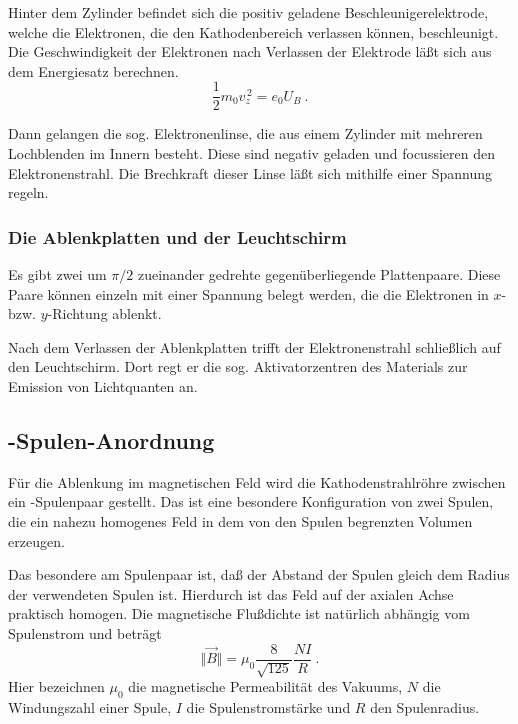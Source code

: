 Hinter dem Zylinder befindet sich die positiv geladene
Beschleunigerelektrode, welche die Elektronen, die den Kathodenbereich
verlassen können, beschleunigt. Die Geschwindigkeit der Elektronen nach
Verlassen der Elektrode läßt sich aus dem Energiesatz berechnen.
%
\begin{equation}
  \label{eq:acc-volt-vel-z}
  \frac{1}{2} m_0 v_z^{\,2} = e_0 U_B \:.
\end{equation}

Dann gelangen die sog. Elektronenlinse, die aus einem Zylinder mit
mehreren Lochblenden im Innern besteht. Diese sind negativ geladen und
focussieren den Elektronenstrahl. Die Brechkraft dieser Linse läßt sich
mithilfe einer Spannung regeln.

\subsubsection{Die Ablenkplatten und der Leuchtschirm}

Es gibt zwei um $\pi/2$ zueinander gedrehte gegenüberliegende
Plattenpaare. Diese Paare können einzeln mit einer Spannung belegt
werden, die die Elektronen in $x$- bzw. $y$-Richtung ablenkt.

Nach dem Verlassen der Ablenkplatten trifft der Elektronenstrahl
schließlich auf den Leuchtschirm. Dort regt er die sog. Aktivatorzentren
des Materials zur Emission von Lichtquanten an.

\subsection{-Spulen-Anordnung}

Für die Ablenkung im magnetischen Feld wird die Kathodenstrahlröhre
zwischen ein -Spulenpaar gestellt. Das ist eine
besondere Konfiguration von zwei Spulen, die ein nahezu homogenes Feld
in dem von den Spulen begrenzten Volumen erzeugen.

Das besondere am Spulenpaar ist, daß der Abstand der Spulen gleich dem
Radius der verwendeten Spulen ist. Hierdurch ist das Feld auf der
axialen Achse praktisch homogen. Die magnetische Flußdichte ist
natürlich abhängig vom Spulenstrom und beträgt
%
\begin{equation}
  \label{eq:mag-force-helmholtz}
  \Vert\vec{B}\Vert = \mu_0 \frac{8}{\sqrt{125}} \frac{NI}{R} \:.
\end{equation}
%
Hier bezeichnen $\mu_0$ die magnetische Permeabilität des Vakuums, $N$
die Windungszahl einer Spule, $I$ die Spulenstromstärke und $R$ den
Spulenradius.
